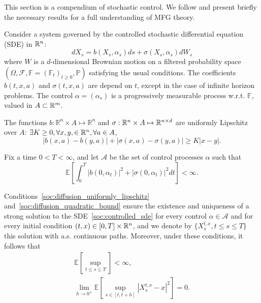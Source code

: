 This section is a compendium of stochastic control.
We follow \cite{Pham} and present briefly the necessary results
for a full understanding of MFG theory.

Consider a system governed by the controlled
stochastic differential equation (SDE) in $\mathbb{R}^n$:
\begin{equation}\label{soc:controlled_sde}
    d X_s = b(X_s, \alpha_s)ds + \sigma(X_s, \alpha_s) d W_s
\end{equation}
where $W$ is a $d$-dimensional Brownian motion on a filtered probability space
$(\Omega, \mathcal{F}, \mathbb{F} = (\mathbb{F}_t)_{t \geq 0}, \mathbb{P} )$ satisfying the
usual conditions.
The coefficients $b(t,x,a)$ and $\sigma(t,x,a)$ are depend on $t$, except
in the case of infinite horizon problems.
The control $\alpha = (\alpha_s)$ is a progressively measurable process w.r.t.
$\mathbb{F}$, valued in $A \subset \mathbb{R}^m$.

The functions $b: \mathbb{R}^n \times A \mapsto \mathbb{R}^n$ and 
$\sigma: \mathbb{R}^n \times A \mapsto \mathbb{R}^{n\times d}$ are uniformly
Lipschitz over $A$: $\exists K \geq 0, \forall x,y, \in \mathbb{R}^n, \forall a \in A$,
\begin{equation}\label{soc:diffusion_uniformly_lipschitz}
    | b(x,a) - b(y,a) | + | \sigma(x,a) - \sigma(y,a) | \geq K | x - y |.   
\end{equation}

Fix a time $0 < T < \infty$, and let $\mathcal{A}$ be the set of control processes
$\alpha$ such that
\begin{equation}\label{soc:diffusion_quadratic_bound}
    \mathbb{E}\left[ \int^T_0 |b( 0,\alpha_t )|^2 + |\sigma( 0, \alpha_t )|^2 dt \right] < \infty.
\end{equation}

Conditions~\eqref{soc:diffusion_uniformly_lipschitz} 
and~\eqref{soc:diffusion_quadratic_bound} ensure the existence and uniqueness
of a strong solution to the SDE~\eqref{soc:controlled_sde}
for every control $\alpha \in \mathcal{A}$ and for every initial condition
$(t,x) \in [0,T] \times \mathbb{R}^n$, and we denote by $\{ X_s^{t,x}, t \leq s \leq T \}$
this solution with a.s. continuous paths. Moreover, under these conditions,
it follows that
    \begin{gather}
        \mathbb{E} \left[ \sup\limits_{t\leq s \leq T} \right] < \infty,\\
        \lim_{h \to 0^+} \mathbb{E} \left[ \sup\limits_{s\in [t,t+h]} | X_s^{t,x} - x |^2 \right] = 0.
    \end{gather}

